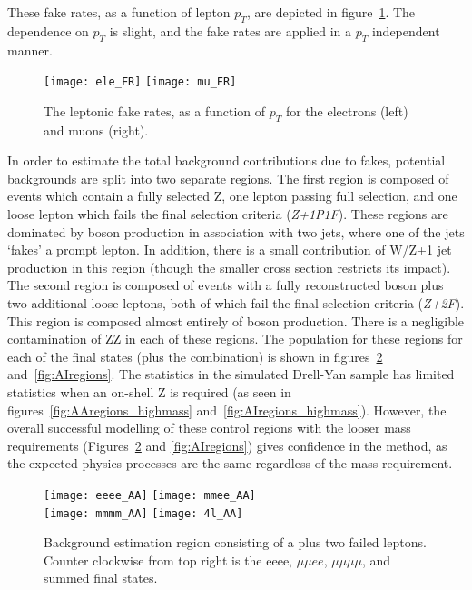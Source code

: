 These fake rates, as a function of lepton $p_{T}$, are depicted in
figure~\ref{fig:fakerates}. The dependence on $p_{T}$ is slight, and the fake
rates are applied in a $p_{T}$ independent manner.
\begin{figure}[h]
\centering
\texttt{[image: ele\_FR]}
\texttt{[image: mu\_FR]}
\caption[Leptonic fake rates used for the background estimation.]{The leptonic
fake rates, as a function of $p_{T}$ for the electrons (left) and muons (right).}
\label{fig:fakerates}
\end{figure}

In order to estimate the total background contributions due to fakes, potential
backgrounds are split into two separate regions. The first region is
composed of events which contain a fully selected Z, one lepton passing full
selection, and one loose lepton which fails the final selection criteria
(\emph{Z+1P1F}).  These regions are dominated by \Z boson production in
association with two jets, where one of the jets `fakes' a prompt lepton. In
addition, there is a small contribution of W/Z+1 jet production in this region
(though the smaller cross section restricts its impact). The second region is
composed of events with a fully reconstructed \Z boson plus two additional loose
leptons, both of which fail the final selection criteria (\emph{Z+2F}). This region is
composed almost entirely of \Z boson production. There is a negligible contamination
of ZZ in each of these regions. The population for these regions for each of the
final states (plus the combination) is shown in figures~\ref{fig:AAregions}
and~\ref{fig:AIregions}. The statistics in the simulated Drell-Yan sample has
limited statistics when an on-shell Z is required (as seen in
figures~\ref{fig:AAregions_highmass} and~\ref{fig:AIregions_highmass}). However,
the overall successful modelling of these control regions with the looser mass
requirements (Figures~\ref{fig:AAregions} and \ref{fig:AIregions}) gives confidence
in the method, as the expected physics processes are the same regardless of the
mass requirement.

\begin{figure}[h]
\centering
\texttt{[image: eeee\_AA]}
\texttt{[image: mmee\_AA]}\\
\texttt{[image: mmmm\_AA]}
\texttt{[image: 4l\_AA]}\\
\caption[Background estimation region consisting of a \Z plus two failed
leptons.]{Background estimation region consisting of a \Z plus two failed
leptons. Counter clockwise from top right is the eeee, $\mu\mu ee$,
$\mu\mu\mu\mu$, and summed final states.}
\label{fig:AAregions}
\end{figure}

